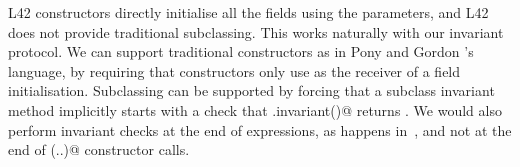 L42 constructors directly initialise all the fields using the parameters, and L42 does not provide traditional subclassing.
This works naturally with our invariant protocol.
We can support traditional constructors as in Pony and Gordon \etal's language, 
by requiring that constructors only use \Q@this@ as the receiver of a field initialisation.
Subclassing can be supported by forcing that a subclass invariant method implicitly starts with a check that \Q@super.invariant()@ returns \Q@true@. We would also perform invariant checks at the end of \Q@new@ expressions, as happens in~\cite{feldman2006jose}, and not at the end of \Q@super(..)@ constructor calls.
